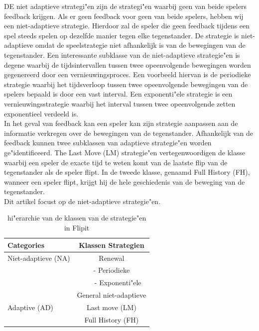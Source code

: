 \documentclass[master=cws, masteroption=vs]{kulemt}
\begin{document}
\begin{abstract*}
DE niet adaptieve strategi"en zijn de strategi"en waarbij geen van beide spelers feedback krijgen. 
Als er geen feedback voor geen van beide spelers, hebben wij een niet-adaptieve strategie. Hierdoor zal de speler die geen feedback tijdens een spel steeds spelen op dezelfde manier tegen elke tegenstander. De strategie is niet-adaptieve omdat de speelstrategie niet afhankelijk is van de bewegingen van de tegenstander. Een interessante subklasse van de niet-adaptieve strategie"en is degene waarbij de tijdsintervallen tussen twee opeenvolgende bewegingen worden gegenereerd door een vernieuwingsproces. Een voorbeeld hiervan is de periodieke strategie waarbij het tijdsverloop tussen twee opeenvolgende bewegingen van de spelers bepaald is door een vast interval. Een exponenti"ele strategie is een vernieuwingsstrategie waarbij het interval tussen twee opeenvolgende zetten exponentieel verdeeld is. \\

In het geval van feedback kan een speler kan zijn strategie aanpassen aan de informatie verkregen over de bewegingen van de tegenstander. Afhankelijk van de feedback kunnen twee subklassen van adaptieve strategie"en worden ge"identificeerd. The Last Move (LM) strategie"en vertegenwoordigen de klasse waarbij een speler de exacte tijd te weten komt van de laatste flip van de tegenstander als de speler flipt. In de tweede klasse, genaamd Full History (FH), wanneer een speler flipt, krijgt hij de hele geschiedenis van de beweging van de tegenstander. \\
Dit artikel focust op de niet-adaptieve strategie"en.  \\


 \begin{table}
 \center
 \begin {tabular} {l | c}
  \textbf{Categories} & \textbf{Klassen Strategien} \\
  \hline Niet-adaptieve (NA) & Renewal \\
  & - Periodieke \\
  & ~~~ - Exponenti"ele \\
  & General niet-adaptieve \\
  \hline Adaptive (AD) & Last move (LM) \\
  & Full History (FH) \\
\end{tabular}
 \caption{hi"erarchie van de klassen van de strategie"en in Flipit}
 \label{tabel: Strategies}
 \end{table}



\end{abstract*}
\end{document}
